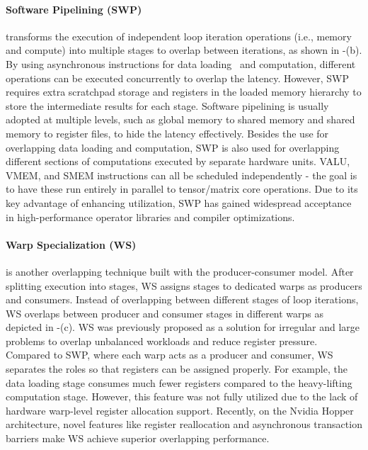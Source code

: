 \paragraph{Software Pipelining (SWP)} transforms the execution of independent loop iteration operations (i.e., memory and compute) into multiple stages to overlap between iterations, as shown in \Fig{\ref{fig:orchastration}}-(b). 
By using asynchronous instructions for data loading~\cite{bauer_cudadma_2011} and computation, different operations can be executed concurrently to overlap the latency. 
However, SWP requires extra scratchpad storage and registers in the loaded memory hierarchy to store the intermediate results for each stage.
Software pipelining is usually adopted at multiple levels, such as global memory to shared memory and shared memory to register files, to hide the latency effectively.
Besides the use for overlapping data loading and computation, SWP is also used for overlapping different sections of computations executed by separate hardware units.
VALU, VMEM, and SMEM instructions\cite{ck, amd_isa} can all be scheduled independently - the goal is to have these run entirely in parallel to tensor/matrix core operations.
Due to its key advantage of enhancing utilization, SWP has gained widespread acceptance in high-performance operator libraries\cite{Thakkar_CUTLASS_2023} and compiler optimizations\cite{huang_alcop_2023}.

\paragraph{Warp Specialization (WS)} is another overlapping technique built with the producer-consumer model\cite{bauer_cudadma_2011,MLSYS2023_d6cde2c1}.
After splitting execution into stages, WS assigns stages to dedicated warps as producers and consumers.
Instead of overlapping between different stages of loop iterations, WS overlaps between producer and consumer stages in different warps as depicted in \Fig{\ref{fig:orchastration}}-(c).
WS was previously proposed as a solution for irregular and large problems to overlap unbalanced workloads and reduce register pressure\cite{crago_wasp_2024}.
Compared to SWP, where each warp acts as a producer and consumer, WS separates the roles so that registers can be assigned properly.
For example, the data loading stage consumes much fewer registers compared to the heavy-lifting computation stage.
However, this feature was not fully utilized due to the lack of hardware warp-level register allocation support.
Recently, on the Nvidia Hopper architecture\cite{choquette2023nvidia}, novel features like register reallocation and asynchronous transaction barriers make WS achieve superior overlapping performance\cite{shah2024flashattention, Thakkar_CUTLASS_2023}.

